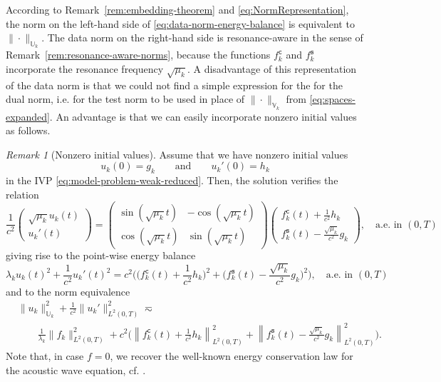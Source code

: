 \documentclass{amsart}
\theoremstyle{plain}
\theoremstyle{remark}
\newtheorem{remark}[theorem]{Remark}
\numberwithin{equation}{section}
\numberwithin{theorem}{section}
\newcommand{\trial}{\mathbb{U}}
\newcommand{\test}{\mathbb{V}}
\newcommand{\fsin}{f_{k}^{\mathtt{s}}}
\newcommand{\fcos}{f_{k}^{\mathtt{c}}}
\begin{document}
According to Remark~\ref{rem:embedding-theorem} and \eqref{eq:NormRepresentation}, the norm on the left-hand side of \eqref{eq:data-norm-energy-balance} is equivalent to $\|\cdot\|_{\trial_k}$. The data norm on the right-hand side is resonance-aware in the sense of Remark~\ref{rem:resonance-aware-norms}, because the functions $\fcos$ and $\fsin$ incorporate the resonance frequency $\sqrt{\mu_k}$. A disadvantage of this representation of the data norm is that we could not find a simple expression for the for the dual norm, i.e. for the test norm to be used in place of $\|\cdot\|_{\test_k}$ from \eqref{eq:spaces-expanded}. An advantage is that we can easily incorporate nonzero initial values as follows.

\begin{remark}[Nonzero initial values]
\label{rem:nonzero-initial-values}
Assume that we have nonzero initial values 
\begin{equation*}
	u_k(0) = g_k \qquad \text{and} \qquad u_k'(0) = h_k
\end{equation*}
in the IVP \eqref{eq:model-problem-weak-reduced}. Then, the solution verifies the relation
\begin{equation*}
	\frac{1}{c^2}\begin{pmatrix}
		\sqrt{\mu_k}u_k(t) \\[3pt] 
		u_k'(t)
	\end{pmatrix} = \begin{pmatrix}
		\sin{(\sqrt{\mu_k}t)} & -\cos{(\sqrt{\mu_k}t)} \\[3pt] 
		\cos{(\sqrt{\mu_k}t)} &\sin{(\sqrt{\mu_k}t)}
	\end{pmatrix}\begin{pmatrix}
		\fcos(t) +\frac{1}{c^2}h_k \\[3pt] 
		\fsin(t)-\frac{\sqrt{\mu_k }}{c^2}g_k
	\end{pmatrix}, \quad \text{a.e. in $(0,T)$}
\end{equation*}
giving rise to the point-wise energy balance
\begin{equation*}
	\lambda_k u_k(t)^2 + \frac{1}{c^2}u_k'(t)^2  = c^2\Big (\Big(\fcos(t)+\frac{1}{c^2}h_k\Big)^2 + \Big( \fsin(t)-\frac{\sqrt{\mu_k}}{c^2} g_k \Big)^2 \Big ), \quad \text{a.e. in $(0,T)$}
\end{equation*}
and to the norm equivalence
\begin{equation*}
	\begin{split}
		&\|u_k\|^2_{\trial_k} + \frac{1}{c^2} \|u_k'\|^2_{L^2(0,T)} 
	\eqsim \\
	& \qquad  \frac{1}{\lambda_k}\|f_k\|^2_{L^2(0,T)} +
	c^2\Big (\left\|\fcos(t)+\frac{1}{c^2}h_k\right\|^2_{L^2(0,T)} + \left \| \fsin(t)-\frac{\sqrt{\mu_k}}{c^2} g_k\right \|^2_{L^2(0,T)} \Big ).
	\end{split}
\end{equation*}
Note that, in case $f=0$, we recover the well-known energy conservation law for the acoustic wave equation, cf. \cite[Chapter XV, Section $4$, Remark 5]{Dautray.Lions:92}.
\end{remark}
\end{document}
